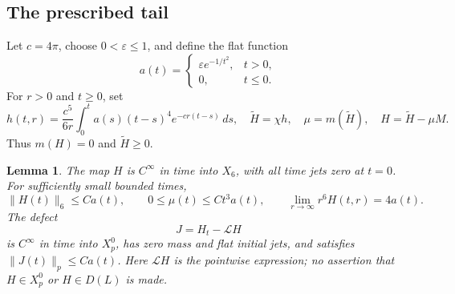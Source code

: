 \documentclass[11pt,a4paper]{article}
\numberwithin{equation}{section}
\newtheorem{lemma}[theorem]{Lemma}
\theoremstyle{remark}
\newcommand{\calL}{\mathcal L}
\newcommand{\dd}{\,d}
\newcommand{\norm}[2]{\lVert #1\rVert_{#2}}
\begin{document}
\subsection*{The prescribed tail}
Let \(c=4\pi\), choose \(0<\varepsilon\leq1\), and define the flat function
\[
 a(t)=\begin{cases}\varepsilon e^{-1/t^2},&t>0,\\0,&t\leq0.\end{cases}
\]
For \(r>0\) and \(t\geq0\), set
\begin{equation}\label{eq:entrance}
 h(t,r)=\frac{c^5}{6r}\int_0^t a(s)(t-s)^4e^{-cr(t-s)}\dd s,\quad
 \widetilde H=\chi h,\quad
 \mu=m(\widetilde H),\quad H=\widetilde H-\mu M.
\end{equation}
Thus \(m(H)=0\) and \(\widetilde H\geq0\).

\begin{lemma}\label{lem:tail}
The map \(H\) is \(C^\infty\) in time into \(X_6\), with all time jets
zero at \(t=0\). For sufficiently small bounded times,
\begin{equation}\label{eq:Hbounds}
 \norm{H(t)}{6}\leq Ca(t),\qquad
 0\leq\mu(t)\leq Ct^3a(t),\qquad
 \lim_{r\to\infty}r^6H(t,r)=4a(t).
\end{equation}
The defect
\begin{equation}\label{eq:J}
 J=H_t-\calL H
\end{equation}
is \(C^\infty\) in time into \(X_p^0\), has zero mass and flat initial
jets, and satisfies \(\norm{J(t)}{p}\leq Ca(t)\).
Here \(\calL H\) is the pointwise expression; no assertion that
\(H\in X_p^0\) or \(H\in D(L)\) is made.
\end{lemma}
\end{document}

